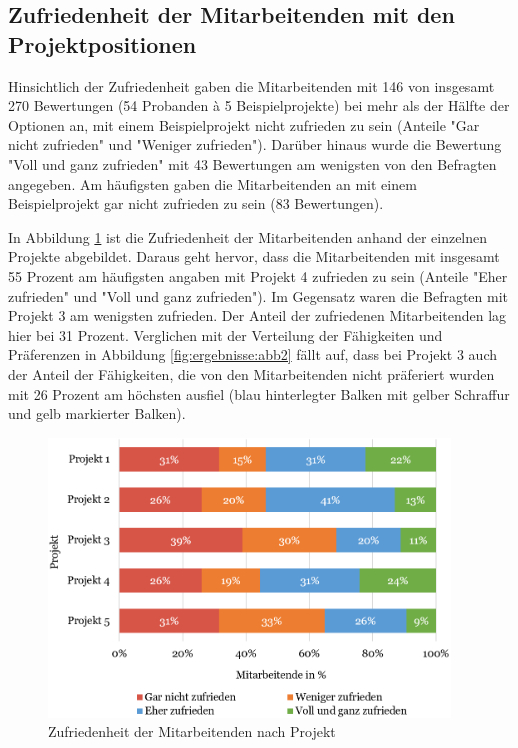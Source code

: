 \subsection{Zufriedenheit der Mitarbeitenden mit den Projektpositionen}
Hinsichtlich der Zufriedenheit gaben die Mitarbeitenden mit 146 von insgesamt 270 Bewertungen (54 Probanden \`{a} 5 Beispielprojekte) bei mehr als der Hälfte der Optionen an, mit einem Beispielprojekt nicht zufrieden zu sein (Anteile "Gar nicht zufrieden" und "Weniger zufrieden").
Darüber hinaus wurde die Bewertung "Voll und ganz zufrieden" mit 43 Bewertungen am wenigsten von den Befragten angegeben.
Am häufigsten gaben die Mitarbeitenden an mit einem Beispielprojekt gar nicht zufrieden zu sein (83 Bewertungen).

In Abbildung \ref{fig:ergebnisse:abb3} ist die Zufriedenheit der Mitarbeitenden anhand der einzelnen Projekte abgebildet.
Daraus geht hervor, dass die Mitarbeitenden mit insgesamt 55 Prozent am häufigsten angaben mit Projekt 4 zufrieden zu sein (Anteile "Eher zufrieden" und "Voll und ganz zufrieden").
Im Gegensatz waren die Befragten mit Projekt 3 am wenigsten zufrieden.
Der Anteil der zufriedenen Mitarbeitenden lag hier bei 31 Prozent.
Verglichen mit der Verteilung der Fähigkeiten und Präferenzen in Abbildung \ref{fig:ergebnisse:abb2} fällt auf, dass bei Projekt 3 auch der Anteil der Fähigkeiten, die von den Mitarbeitenden nicht präferiert wurden mit 26 Prozent am höchsten ausfiel (blau hinterlegter Balken mit gelber Schraffur und gelb markierter Balken).

\begin{figure}[H]
    \centering
	\includegraphics[width=0.95\textwidth]{gfx/verteilung-z-nach-projekt.png}
	\caption[Zufriedenheit der Mitarbeitenden nach Projekt]{Zufriedenheit der Mitarbeitenden nach Projekt}
	\label{fig:ergebnisse:abb3}
\end{figure}

